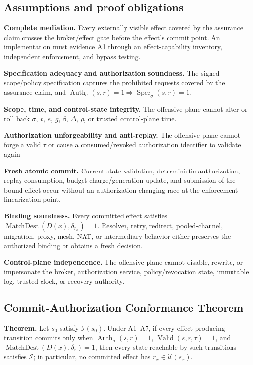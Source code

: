 \documentclass[11pt,letterpaper]{article}
\begin{document}
\subsection{Assumptions and proof obligations}
\begin{description}[leftmargin=0.55in]
\item[A1.] \textbf{Complete mediation.} Every externally visible effect covered by the assurance claim crosses the broker/effect gate before the effect's commit point. An implementation must evidence A1 through an effect-capability inventory, independent enforcement, and bypass testing.
\item[A2.] \textbf{Specification adequacy and authorization soundness.} The signed scope/policy specification captures the prohibited requests covered by the assurance claim, and $\operatorname{Auth}_{\sigma}(s,r)=1\Rightarrow\operatorname{Spec}_{\sigma}(s,r)=1$.
\item[A3.] \textbf{Scope, time, and control-state integrity.} The offensive plane cannot alter or roll back $\sigma$, $v$, $e$, $g$, $\beta$, $\Delta$, $\rho$, or trusted control-plane time.
\item[A4.] \textbf{Authorization unforgeability and anti-replay.} The offensive plane cannot forge a valid $\tau$ or cause a consumed/revoked authorization identifier to validate again.
\item[A5.] \textbf{Fresh atomic commit.} Current-state validation, deterministic authorization, replay consumption, budget charge/generation update, and submission of the bound effect occur without an authorization-changing race at the enforcement linearization point.
\item[A6.] \textbf{Binding soundness.} Every committed effect satisfies $\operatorname{MatchDest}(D(x),\delta_{r_x})=1$. Resolver, retry, redirect, pooled-channel, migration, proxy, mesh, NAT, or intermediary behavior either preserves the authorized binding or obtains a fresh decision.
\item[A7.] \textbf{Control-plane independence.} The offensive plane cannot disable, rewrite, or impersonate the broker, authorization service, policy/revocation state, immutable log, trusted clock, or recovery authority.
\end{description}

\subsection{Commit-Authorization Conformance Theorem}
\textbf{Theorem.} Let $s_0$ satisfy $\mathcal{I}(s_0)$. Under A1--A7, if every effect-producing transition commits only when $\operatorname{Auth}_{\sigma}(s,r)=1$, $\operatorname{Valid}(s,r,\tau)=1$, and $\operatorname{MatchDest}(D(x),\delta_r)=1$, then every state reachable by such transitions satisfies $\mathcal{I}$; in particular, no committed effect has $r_x\in\mathcal{U}(s_x)$.
\end{document}
